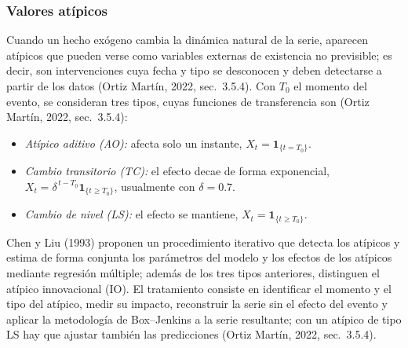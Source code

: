 \documentclass[11pt,letterpaper]{article}
\begin{document}
\subsubsection{Valores atípicos}
Cuando un hecho exógeno cambia la dinámica natural de la serie, aparecen atípicos que pueden verse como variables externas de existencia no previsible; es decir, son intervenciones cuya fecha y tipo se desconocen y deben detectarse a partir de los datos (Ortiz Martín, 2022, sec.~3.5.4). Con $T_0$ el momento del evento, se consideran tres tipos, cuyas funciones de transferencia son (Ortiz Martín, 2022, sec.~3.5.4):
\begin{itemize}[nosep]
\item \emph{Atípico aditivo (AO):} afecta solo un instante, $X_t=\mathbf{1}_{\{t=T_0\}}$.
\item \emph{Cambio transitorio (TC):} el efecto decae de forma exponencial, $X_t=\delta^{\,t-T_0}\mathbf{1}_{\{t\ge T_0\}}$, usualmente con $\delta=0.7$.
\item \emph{Cambio de nivel (LS):} el efecto se mantiene, $X_t=\mathbf{1}_{\{t\ge T_0\}}$.
\end{itemize}
Chen y Liu (1993) proponen un procedimiento iterativo que detecta los atípicos y estima de forma conjunta los parámetros del modelo y los efectos de los atípicos mediante regresión múltiple; además de los tres tipos anteriores, distinguen el atípico innovacional (IO). El tratamiento consiste en identificar el momento y el tipo del atípico, medir su impacto, reconstruir la serie sin el efecto del evento y aplicar la metodología de Box--Jenkins a la serie resultante; con un atípico de tipo LS hay que ajustar también las predicciones (Ortiz Martín, 2022, sec.~3.5.4).
\end{document}
